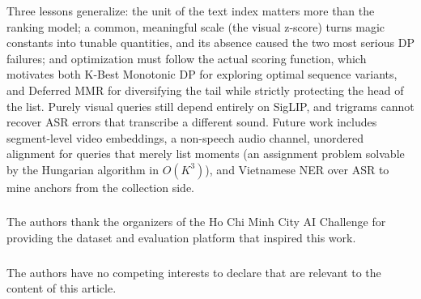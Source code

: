 \documentclass[runningheads]{llncs}
\begin{document}
Three lessons generalize: the unit of the text index matters more than the ranking model; a common, meaningful scale (the visual z-score) turns magic constants into tunable quantities, and its absence caused the two most serious DP failures; and optimization must follow the actual scoring function, which motivates both K-Best Monotonic DP for exploring optimal sequence variants, and Deferred MMR for diversifying the tail while strictly protecting the head of the list. Purely visual queries still depend entirely on SigLIP, and trigrams cannot recover ASR errors that transcribe a different sound. Future work includes segment-level video embeddings, a non-speech audio channel, unordered alignment for queries that merely list moments (an assignment problem solvable by the Hungarian algorithm in $O(K^3)$), and Vietnamese NER over ASR to mine anchors from the collection side.

\begin{credits}
\subsubsection{\ackname} The authors thank the organizers of the Ho Chi Minh City AI Challenge for providing the dataset and evaluation platform that inspired this work.

\subsubsection{\discintname}
The authors have no competing interests to declare that are relevant to the content of this article.
\end{credits}
\end{document}
